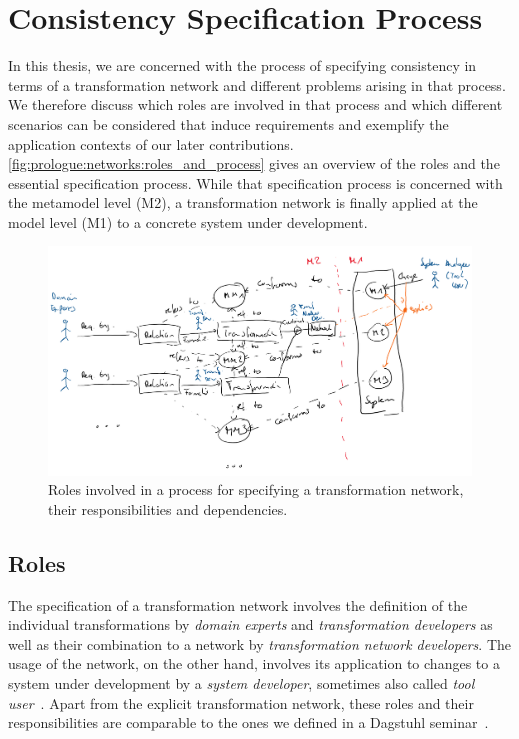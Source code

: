 \section{Consistency Specification Process}
\label{chap:networks:specification_process}

In this thesis, we are concerned with the process of specifying consistency in terms of a transformation network and different problems arising in that process.
We therefore discuss which roles are involved in that process and which different scenarios can be considered that induce requirements and exemplify the application contexts of our later contributions.
\autoref{fig:prologue:networks:roles_and_process} gives an overview of the roles and the essential specification process.
While that specification process is concerned with the metamodel level (M2), a transformation network is finally applied at the model level (M1) to a concrete system under development.

\begin{figure}
    \centering
    \includegraphics[width=\textwidth]{figures/prologue/networks/roles_and_process}
    \caption{Roles involved in a process for specifying a transformation network, their responsibilities and dependencies.}
    \label{fig:prologue:networks:roles_and_process}
\end{figure}


\subsection{Roles}

The specification of a transformation network involves the definition of the individual transformations by \emph{domain experts} and \emph{transformation developers} as well as their combination to a network by \emph{transformation network developers}.
The usage of the network, on the other hand, involves its application to changes to a system under development by a \emph{system developer}, sometimes also called \emph{tool user}~\cite{klare2019dagstuhl}.
Apart from the explicit transformation network, these roles and their responsibilities are comparable to the ones we defined in a Dagstuhl seminar~\cite{klare2019dagstuhl}.

